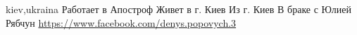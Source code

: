  
 
 
 
 

kiev,ukraina
Работает в Апостроф
Живет в г. Киев
Из г. Киев
В браке с Юлией Рябчун
\url{https://www.facebook.com/denys.popovych.3}\par

